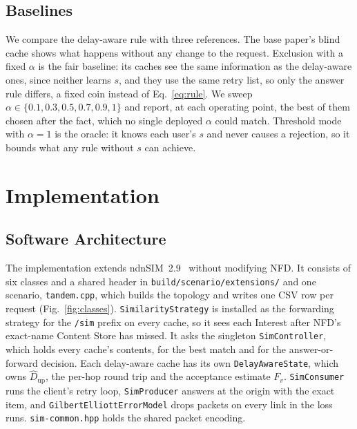 \documentclass[11pt,a4paper]{article}
\newcommand{\code}[1]{\texttt{#1}}
\newcommand{\Dup}{\hat{D}_{\mathrm{up}}}
\begin{document}
\ifdefined\FinalReport
\subsection{Baselines}\label{sec:baselines}
We compare the delay-aware rule with three references. The base paper's blind cache shows what
happens without any change to the request. Exclusion with a fixed $\alpha$ is the fair baseline:
its caches see the same information as the delay-aware ones, since neither learns $s$, and they use
the same retry list, so only the answer rule differs, a fixed coin instead of
Eq.~\eqref{eq:rule}. We sweep $\alpha \in \{0.1, 0.3, 0.5, 0.7, 0.9, 1\}$ and report, at each
operating point, the best of them chosen after the fact, which no single deployed $\alpha$ could
match. Threshold mode with $\alpha = 1$ is the oracle: it knows each user's $s$ and never causes a
rejection, so it bounds what any rule without $s$ can achieve.
\fi

\ifdefined\FinalReport
\section{Implementation}\label{sec:impl}

\subsection{Software Architecture}
The implementation extends ndnSIM~2.9~\cite{mastorakis2017ndnsim} without modifying NFD. It
consists of six classes and a shared header in \code{build/scenario/extensions/} and one scenario,
\code{tandem.cpp}, which builds the topology and writes one CSV row per request
(Fig.~\ref{fig:classes}). \code{SimilarityStrategy} is installed as the forwarding strategy for
the \code{/sim} prefix on every cache, so it sees each Interest after NFD's exact-name Content Store
has missed. It asks the singleton \code{SimController}, which holds every cache's contents, for the
best match and for the answer-or-forward decision. Each delay-aware cache has its own
\code{DelayAwareState}, which owns $\Dup$, the per-hop round trip and the acceptance estimate
$F_v$. \code{SimConsumer} runs the client's retry loop, \code{SimProducer} answers at the origin
with the exact item, and \code{GilbertElliottErrorModel} drops packets on every link in the loss
runs. \code{sim-common.hpp} holds the shared packet encoding.
\end{document}
